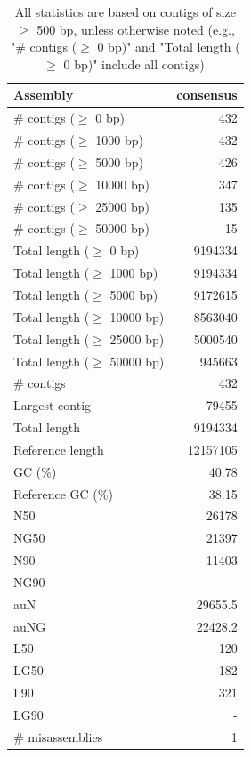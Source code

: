 \documentclass[12pt,a4paper]{article}
\begin{document}
\begin{table}[ht]
\begin{center}
\caption{All statistics are based on contigs of size $\geq$ 500 bp, unless otherwise noted (e.g., "\# contigs ($\geq$ 0 bp)" and "Total length ($\geq$ 0 bp)" include all contigs).}
\begin{tabular}{|l*{1}{|r}|}
\hline
Assembly & consensus \\ \hline
\# contigs ($\geq$ 0 bp) & 432 \\ \hline
\# contigs ($\geq$ 1000 bp) & 432 \\ \hline
\# contigs ($\geq$ 5000 bp) & 426 \\ \hline
\# contigs ($\geq$ 10000 bp) & 347 \\ \hline
\# contigs ($\geq$ 25000 bp) & 135 \\ \hline
\# contigs ($\geq$ 50000 bp) & 15 \\ \hline
Total length ($\geq$ 0 bp) & 9194334 \\ \hline
Total length ($\geq$ 1000 bp) & 9194334 \\ \hline
Total length ($\geq$ 5000 bp) & 9172615 \\ \hline
Total length ($\geq$ 10000 bp) & 8563040 \\ \hline
Total length ($\geq$ 25000 bp) & 5000540 \\ \hline
Total length ($\geq$ 50000 bp) & 945663 \\ \hline
\# contigs & 432 \\ \hline
Largest contig & 79455 \\ \hline
Total length & 9194334 \\ \hline
Reference length & 12157105 \\ \hline
GC (\%) & 40.78 \\ \hline
Reference GC (\%) & 38.15 \\ \hline
N50 & 26178 \\ \hline
NG50 & 21397 \\ \hline
N90 & 11403 \\ \hline
NG90 & - \\ \hline
auN & 29655.5 \\ \hline
auNG & 22428.2 \\ \hline
L50 & 120 \\ \hline
LG50 & 182 \\ \hline
L90 & 321 \\ \hline
LG90 & - \\ \hline
\# misassemblies & 1 \\ \hline

\end{tabular}
\end{center}
\end{table}
\end{document}
